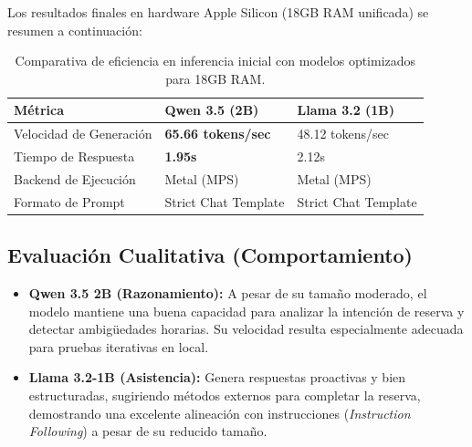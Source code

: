 Los resultados finales en hardware Apple Silicon (18GB RAM unificada) se resumen a continuación:

\begin{table}[H]
    \centering
    \begin{tabularx}{\textwidth}{|l|X|X|}
        \hline
        \textbf{Métrica}          & \textbf{Qwen 3.5 (2B)}  & \textbf{Llama 3.2 (1B)}    \\ \hline
        Velocidad de Generación   & \textbf{65.66 tokens/sec} & 48.12 tokens/sec              \\ \hline
        Tiempo de Respuesta       & \textbf{1.95s}          & 2.12s                         \\ \hline
        Backend de Ejecución      & Metal (MPS)             & Metal (MPS)                   \\ \hline
        Formato de Prompt         & Strict Chat Template    & Strict Chat Template          \\ \hline
    \end{tabularx}
    \caption{Comparativa de eficiencia en inferencia inicial con modelos optimizados para 18GB RAM.}
    \label{tab:inferencia_cuantitativa_final}
\end{table}

\subsection{Evaluación Cualitativa (Comportamiento)}

\begin{itemize}
    \item \textbf{Qwen 3.5 2B (Razonamiento):} A pesar de su tamaño moderado, el modelo mantiene una buena capacidad para analizar la intención de reserva y detectar ambigüedades horarias. Su velocidad resulta especialmente adecuada para pruebas iterativas en local.
    \item \textbf{Llama 3.2-1B (Asistencia):} Genera respuestas proactivas y bien estructuradas, sugiriendo métodos externos para completar la reserva, demostrando una excelente alineación con instrucciones (\textit{Instruction Following}) a pesar de su reducido tamaño.
\end{itemize}
